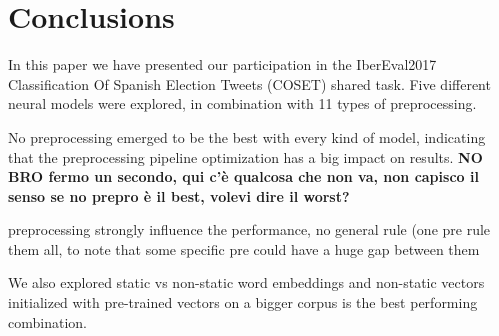 \section{Conclusions} \label{sec:conclusion}

In this paper we have presented our participation in the IberEval2017 Classification Of Spanish Election Tweets (COSET) shared task. Five different neural models were explored, in combination with 11 types of preprocessing.


No preprocessing emerged to be the best with every kind of model, indicating that the preprocessing pipeline optimization has a big impact on results. \textbf{NO BRO fermo un secondo, qui c'è qualcosa che non va, non capisco il senso se no prepro è il best, volevi dire il worst?}

preprocessing strongly influence the performance, no general rule (one pre rule them all, to note that some specific pre could have a huge gap between them 

We also explored static vs non-static word embeddings and non-static vectors initialized with pre-trained vectors on a bigger corpus is the best performing combination.



